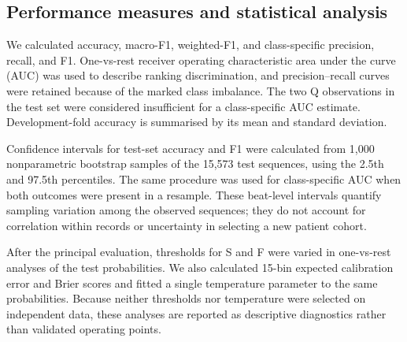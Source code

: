 \subsection{Performance measures and statistical analysis}
We calculated accuracy, macro-F1, weighted-F1, and class-specific precision, recall, and F1. One-vs-rest receiver operating characteristic area under the curve (AUC) was used to describe ranking discrimination, and precision--recall curves were retained because of the marked class imbalance\cite{fawcett2006introduction,saito2015precision}. The two Q observations in the test set were considered insufficient for a class-specific AUC estimate. Development-fold accuracy is summarised by its mean and standard deviation.

Confidence intervals for test-set accuracy and F1 were calculated from 1{,}000 nonparametric bootstrap samples of the 15{,}573 test sequences, using the 2.5th and 97.5th percentiles. The same procedure was used for class-specific AUC when both outcomes were present in a resample. These beat-level intervals quantify sampling variation among the observed sequences; they do not account for correlation within records or uncertainty in selecting a new patient cohort.

After the principal evaluation, thresholds for S and F were varied in one-vs-rest analyses of the test probabilities. We also calculated 15-bin expected calibration error and Brier scores and fitted a single temperature parameter to the same probabilities. Because neither thresholds nor temperature were selected on independent data, these analyses are reported as descriptive diagnostics rather than validated operating points.
